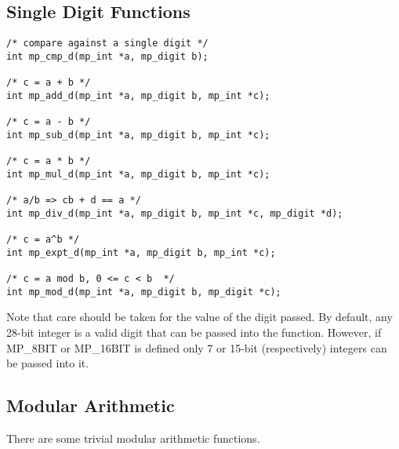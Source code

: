 \documentclass[]{article}
\begin{document}
\subsection{Single Digit Functions}

\begin{verbatim}
/* compare against a single digit */
int mp_cmp_d(mp_int *a, mp_digit b);

/* c = a + b */
int mp_add_d(mp_int *a, mp_digit b, mp_int *c);

/* c = a - b */
int mp_sub_d(mp_int *a, mp_digit b, mp_int *c);

/* c = a * b */
int mp_mul_d(mp_int *a, mp_digit b, mp_int *c);

/* a/b => cb + d == a */
int mp_div_d(mp_int *a, mp_digit b, mp_int *c, mp_digit *d);

/* c = a^b */
int mp_expt_d(mp_int *a, mp_digit b, mp_int *c);

/* c = a mod b, 0 <= c < b  */
int mp_mod_d(mp_int *a, mp_digit b, mp_digit *c);
\end{verbatim}

Note that care should be taken for the value of the digit passed.  By default, any 28-bit integer is a valid digit that can
be passed into the function.  However, if MP\_8BIT or MP\_16BIT is defined only 7 or 15-bit (respectively) integers 
can be passed into it.

\subsection{Modular Arithmetic}

There are some trivial modular arithmetic functions.
\end{document}
